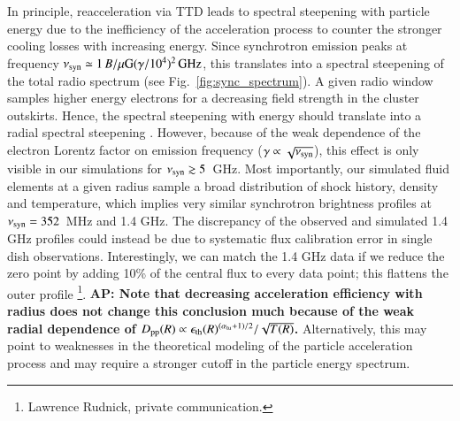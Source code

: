 \documentclass[useAMS,usenatbib]{mn2e}
\def\AP#1{{\bf  AP: #1}}
\begin{document}
In principle, reacceleration via TTD leads to spectral steepening with
particle energy due to the inefficiency of the acceleration process to
counter the stronger cooling losses with increasing energy. Since
synchrotron emission peaks at frequency $\nu_{\mathrm{syn}}\simeq 1\,
B/\mu{\mathrm{G}} (\gamma/10^4)^2\,{\mathrm{GHz}}$, this translates into a
spectral steepening of the total radio spectrum (see
Fig.~\ref{fig:sync_spectrum}). A given radio window samples higher
energy electrons for a decreasing field strength in the cluster
outskirts. Hence, the spectral steepening with energy should translate
into a radial spectral steepening \citep{brunetti12}. However, because
of the weak dependence of the electron Lorentz factor on emission
frequency ($\gamma\propto\sqrt{\nu_{\mathrm{syn}}}$), this effect is only
visible in our simulations for $\nu_{\mathrm{syn}}\gtrsim5$~GHz. Most
importantly, our simulated fluid elements at a given radius sample a
broad distribution of shock history, density and temperature, which
implies very similar synchrotron brightness profiles at
$\nu_{\mathrm{syn}}=352$~MHz and 1.4 GHz. The discrepancy of the observed
and simulated 1.4 GHz profiles could instead be due to systematic flux
calibration error in single dish observations. Interestingly, we can
match the 1.4 GHz data if we reduce the zero point by adding 10\% of
the central flux to every data point; this flattens the outer
profile \footnote{Lawrence Rudnick, private communication.}.  \AP{Note
  that decreasing acceleration efficiency with radius does not change
  this conclusion much because of the weak radial dependence of
  $D_{\mathrm{pp}}(R)\propto \epsilon_{\mathrm{th}}(R)^{(\alpha_{\mathrm{tu}}+1)/2}/\sqrt{T(R)}$.}
Alternatively, this may point to weaknesses in the theoretical
modeling of the particle acceleration process and may require a
stronger cutoff in the particle energy spectrum.
\end{document}
